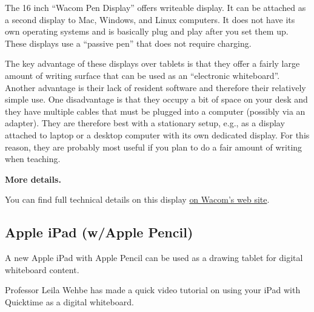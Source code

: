 \begin{gram}
\label{grm:displays::wacom::16}
The 16 inch ``Wacom Pen Display'' offers writeable display.
%
It can be attached as a second display to  Mac, Windows, and Linux computers.  
%
It does not have its own operating systems and is basically plug
and play after you set them up.
%
These displays use a ``passive pen'' that does not require charging.  

The key advantage of these displays over tablets is that they offer a fairly large amount of writing surface that can be used as an ``electronic whiteboard''.  
%
Another advantage is their lack of resident software and therefore their relatively simple use. 
%
One disadvantage is that they occupy a bit of space on your desk and they have multiple cables that must be plugged into a computer (possibly via an adapter).  
%
They are therefore best with a stationary setup, e.g., as a display attached to laptop or a desktop computer with its own dedicated display.
%
For this reason, they are probably most useful if you plan to do a fair amount of writing when teaching.

\textbf{More details.}

You can find full technical details on this display
\href{https://estore.wacom.com/en-US/dtk-1660e-fhd-interactive-pen-display-us-dtk1660ek0a.html?country_code=US}
{on Wacom's web site}.

\end{gram}






\subsection{Apple iPad (w/Apple Pencil)}
\label{sec:displays::idap}

\begin{gram}
\label{grm:displays::ipad}
A new Apple iPad with Apple Pencil can be used as a drawing tablet for digital whiteboard content. 

Professor Leila Wehbe has made a quick video tutorial on using your iPad with Quicktime as a digital whiteboard.

\end{gram}
 
